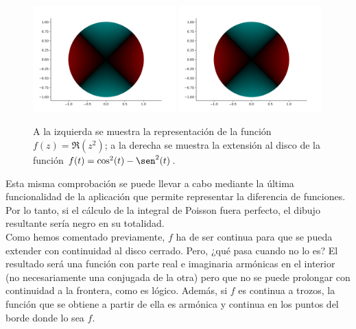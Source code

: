 \begin{figure}[h]
    \centering
    \includegraphics[width=0.49\textwidth]{../Aplicacion/z^2(3).png}
    \hfill
    \includegraphics[width=0.49\textwidth]{../Aplicacion/cos^2(t)-sen^2(t).png}
    \caption{A la izquierda se muestra la representación de la función $f(z) = \Re (z^2)$; a la derecha se muestra la extensión al disco de la función $f(t) = \cos^2(t) - \sen^2(t)$.}
    \label{fig:comparacion4}
\end{figure}

Esta misma comprobación se puede llevar a cabo mediante la última funcionalidad de la aplicación que permite representar la diferencia de funciones. Por lo tanto, si el cálculo de la integral de Poisson fuera perfecto, el dibujo resultante sería negro en su totalidad. \\

Como hemos comentado previamente, $f$ ha de ser continua para que se pueda extender con continuidad al disco cerrado. Pero, ¿qué pasa cuando no lo es? El resultado será una función con parte real e imaginaria armónicas en el interior (no necesariamente una conjugada de la otra) pero que no se puede prolongar con continuidad a la frontera, como es lógico. Además, si $f$ es continua a trozos, la función que se obtiene a partir de ella es armónica y continua en los puntos del borde donde lo sea $f$. \\

